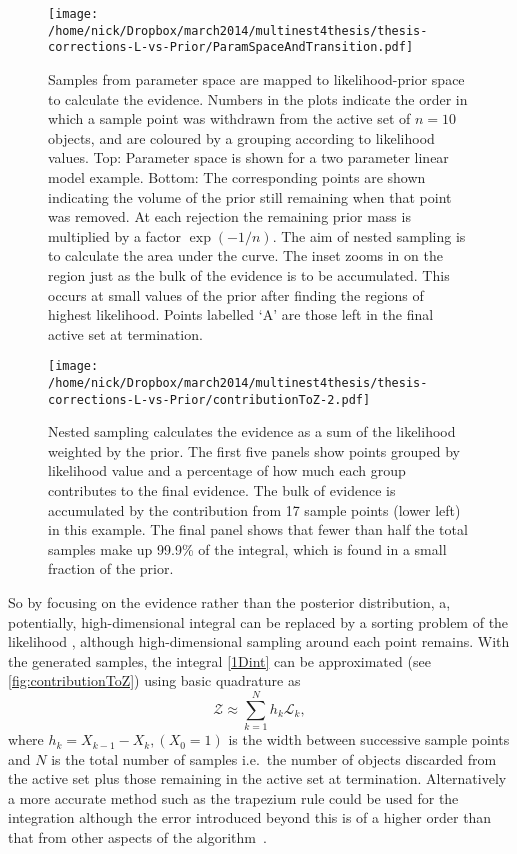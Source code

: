 \begin{figure*}[htbp]
\texttt{[image: /home/nick/Dropbox/march2014/multinest4thesis/thesis-corrections-L-vs-Prior/ParamSpaceAndTransition.pdf]}
\caption{Samples from parameter space are mapped to likelihood-prior space to calculate the evidence.
Numbers in the plots indicate the order in which a sample point was withdrawn from the active set of $n=10$ objects, and are coloured by a grouping according to likelihood values.
Top: Parameter space is shown for a two parameter linear model example.
Bottom: The corresponding points are shown indicating the volume of the prior still remaining when that point was removed.
At each rejection the remaining prior mass is multiplied by a factor $\exp(-1/n)$.
The aim of nested sampling is to calculate the area under the curve.
The inset zooms in on the region just as the bulk of the evidence is to be accumulated.
This occurs at small values of the prior after finding the regions of highest likelihood.
Points labelled `A' are those left in the final active set at termination.
}
\label{fig:NSexplain}
\end{figure*}
\begin{figure*}[htbp]
\texttt{[image: /home/nick/Dropbox/march2014/multinest4thesis/thesis-corrections-L-vs-Prior/contributionToZ-2.pdf]}
\caption{Nested sampling calculates the evidence as a sum of the likelihood weighted by the prior.
The first five panels show points grouped by likelihood value and a percentage of how much each group contributes to the final evidence.
The bulk of evidence is accumulated by the contribution from 17 sample points (lower left) in this example.
The final panel shows that fewer than half the total samples make up 99.9\% of the integral, which is found in a small fraction of the prior.
}
\label{fig:contributionToZ}
\end{figure*}
So by focusing on the evidence rather than the posterior distribution, a, potentially, high-dimensional integral can be replaced by a sorting problem of the likelihood \cite{sivia2006}, although high-dimensional sampling around each point remains.
With the generated samples, the integral \eqref{1Dint} can be approximated (see \autoref{fig:contributionToZ}) using basic quadrature as 
\begin{equation}\label{Zsum}
\mathcal Z \approx \sum_{k=1}^{N} h_k \mathcal L_k,
\end{equation}
where $h_k = X_{k-1} - X_{k}, (X_0 = 1)$ is the width between successive sample points and $N$ is the total number of samples i.e.~the number of objects discarded from the active set plus those remaining in the active set at termination.
Alternatively a more accurate method such as the trapezium rule could be used for the integration although the error introduced beyond this is of a higher order than that from other aspects of the algorithm~\cite{Skilling2006}.

